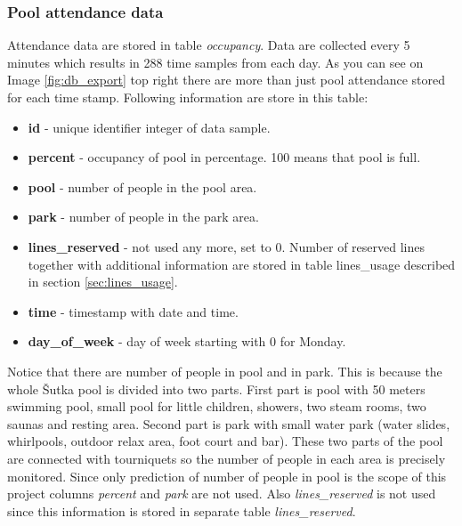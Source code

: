 \documentclass{article}
\begin{document}
\subsubsection{Pool attendance data}
Attendance data are stored in table \emph{occupancy}. Data are collected every 5 minutes which results in 288 time samples from each day. As you can see on Image \ref{fig:db_export} top right there are more than just pool attendance stored for each time stamp. Following information are store in this table:
\begin{itemize}
    \item \textbf{id} - unique identifier integer of data sample.
    \item \textbf{percent} - occupancy of pool in percentage. 100 means that pool is full. 
    \item \textbf{pool} - number of people in the pool area.
    \item \textbf{park} - number of people in the park area.
    \item \textbf{lines\_reserved} - not used any more, set to 0. Number of reserved lines together with additional information are stored in table lines\_usage described in section \ref{sec:lines_usage}.
    \item \textbf{time} - timestamp with date and time.
    \item \textbf{day\_of\_week} - day of week starting with 0 for Monday.
\end{itemize}

Notice that there are number of people in pool and in park. This is because the whole \v{S}utka pool is divided into two parts. First part is pool with 50 meters swimming pool, small pool for little children, showers, two steam rooms, two saunas and resting area. Second part is park with small water park (water slides, whirlpools, outdoor relax area, foot court and bar). These two parts of the pool are connected with tourniquets so the number of people in each area is precisely monitored. Since only prediction of number of people in pool is the scope of this project columns \emph{percent} and \emph{park} are not used. Also \emph{lines\_reserved} is not used since this information is stored in separate table \emph{lines\_reserved}.
\end{document}
